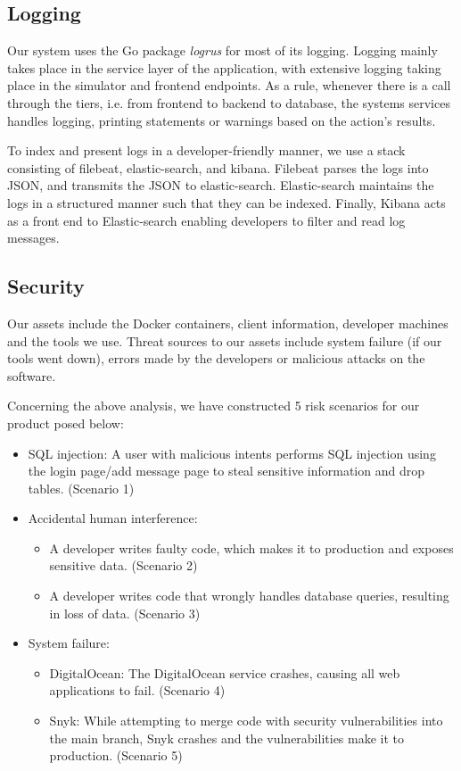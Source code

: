 \subsection{Logging}
Our system uses the Go package \textit{logrus} for most of its logging. Logging mainly takes place in the service layer of the application, with extensive logging taking place in the simulator and frontend endpoints. As a rule, whenever there is a call through the tiers, i.e. from frontend to backend to database, the systems services handles logging, printing statements or warnings based on the action's results.

To index and present logs in a developer-friendly manner, we use a stack consisting of filebeat, elastic-search, and kibana.
Filebeat parses the logs into JSON, and transmits the JSON to elastic-search.
Elastic-search maintains the logs in a structured manner such that they can be indexed. 
Finally, Kibana acts as a front end to Elastic-search enabling developers to filter and read log messages.

\subsection{Security}
Our assets include the Docker containers, client information, developer machines and the tools we use. Threat sources to our assets include system failure (if our tools went down), errors made by the developers or malicious attacks on the software.

Concerning the above analysis, we have constructed 5 risk scenarios for our product posed below:
\begin{itemize}
    \item SQL injection: A user with malicious intents performs SQL injection using the login page/add message page to steal sensitive information and drop tables. (Scenario 1)
    
    \item Accidental human interference: 
    \begin{itemize}
        \item A developer writes faulty code, which makes it to production and exposes sensitive data. (Scenario 2)
        \item A developer writes code that wrongly handles database queries, resulting in loss of data. (Scenario 3)
    \end{itemize}
    
    \item System failure:
    
    \begin{itemize}
        \item DigitalOcean: The DigitalOcean service crashes, causing all web applications to fail. (Scenario 4)
        \item Snyk: While attempting to merge code with security vulnerabilities into the main branch, Snyk crashes and the vulnerabilities make it to production. (Scenario 5)
    \end{itemize}
\end{itemize}

